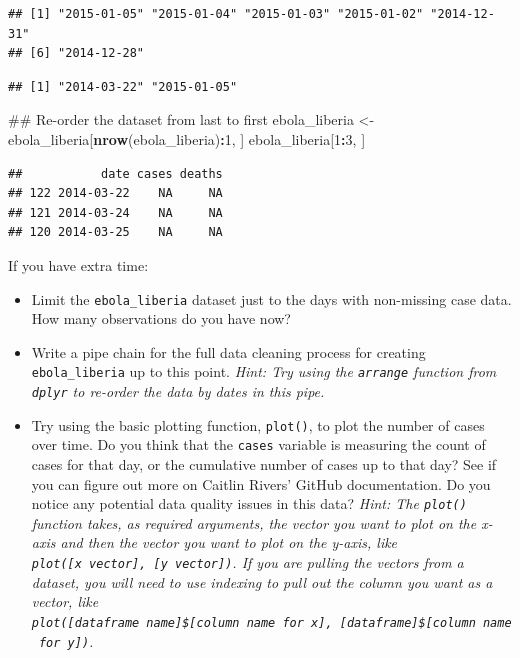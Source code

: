 \documentclass[]{book}
\makeatletter
\newenvironment{Shaded}{\begin{snugshade}}{\end{snugshade}}
\newcommand{\KeywordTok}[1]{\textcolor[rgb]{0.13,0.29,0.53}{\textbf{#1}}}
\newcommand{\DecValTok}[1]{\textcolor[rgb]{0.00,0.00,0.81}{#1}}
\newcommand{\StringTok}[1]{\textcolor[rgb]{0.31,0.60,0.02}{#1}}
\newcommand{\OperatorTok}[1]{\textcolor[rgb]{0.81,0.36,0.00}{\textbf{#1}}}
\newcommand{\NormalTok}[1]{#1}
\providecommand{\tightlist}{%
  \setlength{\itemsep}{0pt}\setlength{\parskip}{0pt}}
\newenvironment{kframe}{%
\medskip{}
\setlength{\fboxsep}{.8em}
 \def\at@end@of@kframe{}%
 \ifinner\ifhmode%
  \def\at@end@of@kframe{\end{minipage}}%
  \begin{minipage}{\columnwidth}%
 \fi\fi%
 \def\FrameCommand##1{\hskip\@totalleftmargin \hskip-\fboxsep
 \colorbox{shadecolor}{##1}\hskip-\fboxsep
     \hskip-\linewidth \hskip-\@totalleftmargin \hskip\columnwidth}%
 \MakeFramed {\advance\hsize-\width
   \@totalleftmargin\z@ \linewidth\hsize
   \@setminipage}}%
 {\par\unskip\endMakeFramed%
 \at@end@of@kframe}
\renewenvironment{Shaded}{\begin{kframe}}{\end{kframe}}
\theoremstyle{definition}
\theoremstyle{definition}
\theoremstyle{definition}
\theoremstyle{remark}
\makeatother
\begin{document}
\begin{verbatim}
## [1] "2015-01-05" "2015-01-04" "2015-01-03" "2015-01-02" "2014-12-31"
## [6] "2014-12-28"
\end{verbatim}

\begin{Shaded}
\end{Shaded}

\begin{verbatim}
## [1] "2014-03-22" "2015-01-05"
\end{verbatim}

\begin{Shaded}
\begin{Highlighting}[]
\NormalTok{## Re-order the dataset from last to first}
\NormalTok{ebola_liberia <-}\StringTok{ }\NormalTok{ebola_liberia[}\KeywordTok{nrow}\NormalTok{(ebola_liberia)}\OperatorTok{:}\DecValTok{1}\NormalTok{, ]}
\NormalTok{ebola_liberia[}\DecValTok{1}\OperatorTok{:}\DecValTok{3}\NormalTok{, ]}
\end{Highlighting}
\end{Shaded}

\begin{verbatim}
##           date cases deaths
## 122 2014-03-22    NA     NA
## 121 2014-03-24    NA     NA
## 120 2014-03-25    NA     NA
\end{verbatim}

If you have extra time:

\begin{itemize}
\tightlist
\item
  Limit the \texttt{ebola\_liberia} dataset just to the days with
  non-missing case data. How many observations do you have now?
\item
  Write a pipe chain for the full data cleaning process for creating
  \texttt{ebola\_liberia} up to this point. \emph{Hint: Try using the
  \texttt{arrange} function from \texttt{dplyr} to re-order the data by
  dates in this pipe.}
\item
  Try using the basic plotting function, \texttt{plot()}, to plot the
  number of cases over time. Do you think that the \texttt{cases}
  variable is measuring the count of cases for that day, or the
  cumulative number of cases up to that day? See if you can figure out
  more on Caitlin Rivers' GitHub documentation. Do you notice any
  potential data quality issues in this data? \emph{Hint: The
  \texttt{plot()} function takes, as required arguments, the vector you
  want to plot on the x-axis and then the vector you want to plot on the
  y-axis, like \texttt{plot({[}x\ vector{]},\ {[}y\ vector{]})}. If you
  are pulling the vectors from a dataset, you will need to use indexing
  to pull out the column you want as a vector, like
  \texttt{plot({[}dataframe\ name{]}\${[}column\ name\ for\ x{]},\ {[}dataframe{]}\${[}column\ name\ for\ y{]})}.}
\end{itemize}
\end{document}
